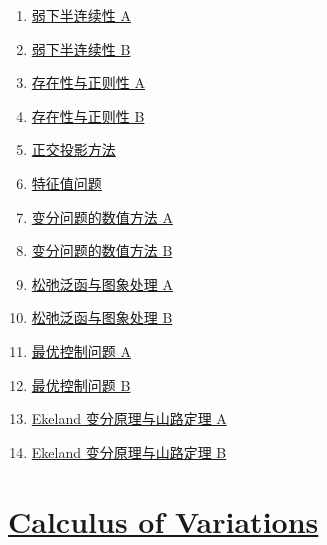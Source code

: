 \documentclass[11pt]{article}
\begin{document}
\begin{enumerate}
	\item  \href{https://mp.weixin.qq.com/s/sMS7nJn2RPrjSw7ZsK5mRw}{弱下半连续性 A} %
	\item  \href{https://mp.weixin.qq.com/s/jF3RTOD3nSp9i5HPQ3fVkw}{弱下半连续性 B} %
	\item  \href{https://mp.weixin.qq.com/s/3DBfHz_O7Iw5mpwjDNJDMA}{存在性与正则性 A} %
	\item  \href{https://mp.weixin.qq.com/s/p5VRGnKwloZeQp6CdRUHrw}{存在性与正则性 B} %
	\item  \href{https://mp.weixin.qq.com/s/lI1tqSgLZEv_VlCMKw61ug}{正交投影方法} %
	\item  \href{https://mp.weixin.qq.com/s/J4-O5z_BhqJh4HuskbSnkQ}{特征值问题} %
	\item  \href{https://mp.weixin.qq.com/s/-xP_qOKpD1KrLlnIgJjwiA}{变分问题的数值方法 A} %
	\item  \href{https://mp.weixin.qq.com/s/L6KNb3Wjwna__O4-T-CrGw}{变分问题的数值方法 B} %
	\item  \href{https://mp.weixin.qq.com/s/Y5TT9Egd2z_dxMuzBHW8dw}{松弛泛函与图象处理 A} %
	\item  \href{https://mp.weixin.qq.com/s/R21wUSIpfYFm_6K3yAZ3kg}{松弛泛函与图象处理 B} %
	\item  \href{https://mp.weixin.qq.com/s/DcrTZelPbjB82yiG94yPjg}{ 最优控制问题 A} %
	\item  \href{https://mp.weixin.qq.com/s/jS9wYb1IofK5Zbz96bF-MQ}{ 最优控制问题 B} %
	\item  \href{https://mp.weixin.qq.com/s/P5QY1hJktDyG2VrdEU2d4Q}{Ekeland 变分原理与山路定理 A} %
	\item  \href{https://mp.weixin.qq.com/s/jnDiRCPRhdzbPP-Cn23GMg}{Ekeland 变分原理与山路定理 B} %
\end{enumerate}

\section*{ \normalfont \large \href{https://www.silviofanzon.com/blog/2021/Calculus-of-Variations/}{Calculus of Variations}}

\vspace{-0.5cm}
\end{document}
